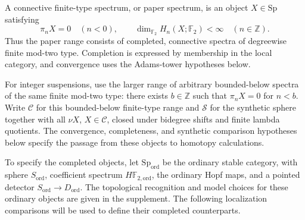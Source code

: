 \begin{definition}
\label{sem:AdamsSynthetic:paper-spectrum-scope}
A connective finite-type spectrum, or paper spectrum, is an object $X\in\mathrm{Sp}$ satisfying
\[
  \pi_nX=0\quad(n<0),\qquad
  \dim_{\mathbb F_2}H_n(X;\mathbb F_2)<\infty\quad(n\in\mathbb Z).
\]
Thus the paper range consists of completed, connective spectra of degreewise finite mod-two type. Completion is expressed by membership in the local category, and
convergence uses the Adams-tower hypotheses below.

For integer suspensions, use the larger range of arbitrary bounded-below spectra of the same finite mod-two type: there exists $b\in\mathbb Z$ such that $\pi_nX=0$ for $n<b$. Write $\mathcal C$ for this bounded-below finite-type range and $\mathcal S$ for the synthetic sphere together with all $\nu X$, $X\in\mathcal C$, closed under bidegree shifts and finite lambda quotients. The convergence, completeness, and synthetic comparison hypotheses below
specify the passage from these objects to homotopy calculations.
\end{definition}

To specify the completed objects, let $\mathrm{Sp}_{\mathrm{ord}}$
be the ordinary stable category, with sphere $S_{\mathrm{ord}}$,
coefficient spectrum $H\mathbb F_{2,\mathrm{ord}}$, the ordinary Hopf
maps, and a pointed detector $S_{\mathrm{ord}}\to D_{\mathrm{ord}}$.
The topological recognition and model choices for these ordinary objects
are given in the supplement. The following localization comparisons
will be used to define their completed counterparts.

